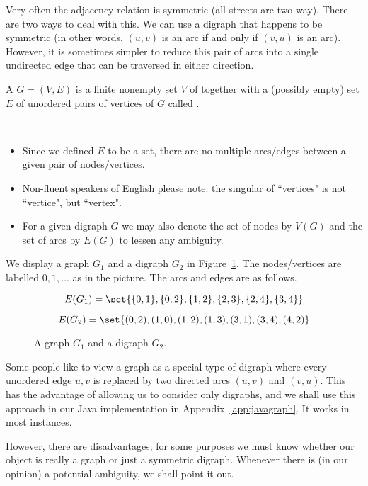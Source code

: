 Very often the adjacency relation is symmetric (all streets are
two-way). There are two ways to deal with this. We can use a digraph
that happens to be symmetric (in other words, $(u, v)$ is an arc if and
only if $(v, u)$ is an arc). However, it is sometimes simpler to reduce
this pair of arcs into a single undirected edge that can be traversed in
either direction.

\begin{Definition}\label{def:graph}
A  $G=(V,E)$ is a finite nonempty  set $V$ of 
 together with a (possibly empty) set $E$ of unordered
pairs of vertices of $G$ called .
\end{Definition}

\begin{note}
\

\begin{itemize}
\item
Since we defined $E$ to be a set, there are no multiple arcs/edges
between a given pair of nodes/vertices.
\item
Non-fluent speakers of English please note: the singular of ``vertices" is not
``vertice", but ``vertex".
\item
For a given digraph $G$ we may also denote the set of nodes by $V(G)$
and the set of arcs by $E(G)$ to lessen any ambiguity.
\end{itemize}
\end{note}

\begin{Example}
\label{eg:graphExample}

We display a graph $G_1$ and a digraph $G_2$ in
Figure~\ref{fig:graphExample}. The
nodes/vertices are labelled $0, 1, \dots $ as in the picture. The arcs
and edges are as follows.

$$E(G_1) = \set{\{0,1\},\{0,2\},\{1,2\},\{2,3\},\{2,4\},\{3,4\}}$$

$$E(G_2) = \set{(0,2),(1,0),(1,2),(1,3),(3,1),(3,4),(4,2)}$$


\begin{figure}
\centerline{}
\caption{A graph $G_1$ and a digraph $G_2$.}
\label{fig:graphExample}
\end{figure}

\end{Example}

\begin{note} 
Some people like to view a graph as a special type of digraph where
every unordered edge ${u,v}$ is replaced by two directed arcs $(u,v)$
and $(v,u)$.  This has the advantage of allowing us to consider only
digraphs, and we shall use this approach in our Java implementation in 
Appendix~\ref{app:javagraph}. It works in most instances.

However, there are disadvantages; for some purposes we must know whether
our object is really a graph or just a symmetric digraph. Whenever there
is (in our opinion) a potential ambiguity, we shall point it out.
\end{note}

